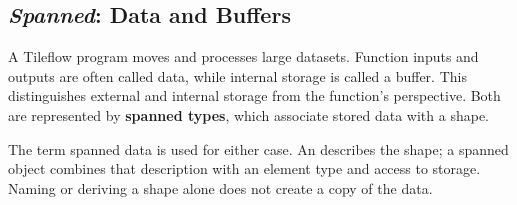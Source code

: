 \subsection*{\emph{Spanned}: Data and Buffers}

A Tileflow program moves and processes large datasets. Function inputs and outputs are often called data, while internal storage is called a buffer. This distinguishes external and internal storage from the function's perspective. Both are represented by \textbf{spanned types}, which associate stored data with a shape.

The term spanned data is used for either case. An \co@mdspan@ describes the shape; a spanned object combines that description with an element type and access to storage. Naming or deriving a shape alone does not create a copy of the data.
